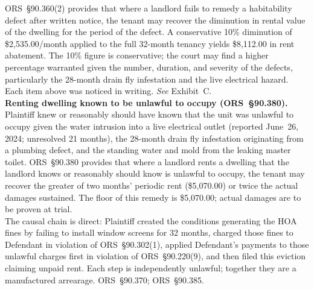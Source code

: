 \documentclass[10pt,letterpaper,oneside]{extarticle}
\begin{document}
\indent ORS~\S90.360(2) provides that where a landlord
fails to remedy a habitability defect after written notice,
the tenant may recover the diminution in rental value of
the dwelling for the period of the defect. A conservative
10\% diminution of \$2,535.00/month applied to the full
32-month tenancy yields \$8,112.00 in rent abatement. The
10\% figure is conservative; the court may find a higher
percentage warranted given the number, duration, and
severity of the defects, particularly the 28-month drain
fly infestation and the live electrical hazard. Each item
above was noticed in writing. \textit{See} Exhibit~C.\\
\indent \textbf{Renting dwelling known to be unlawful to
	occupy (ORS~\S90.380).} Plaintiff knew or reasonably should
have known that the unit was unlawful to occupy given the
water intrusion into a live electrical outlet (reported
June~26, 2024; unresolved 21 months), the 28-month drain
fly infestation originating from a plumbing defect, and the
standing water and mold from the leaking master toilet.
ORS~\S90.380 provides that where a landlord rents a
dwelling that the landlord knows or reasonably should know
is unlawful to occupy, the tenant may recover the greater
of two months' periodic rent (\$5,070.00) or twice the
actual damages sustained. The floor of this remedy is
\$5,070.00; actual damages are to be proven at trial.\\
\indent The causal chain is direct: Plaintiff created the
conditions generating the HOA fines by failing to install
window screens for 32 months, charged those fines to
Defendant in violation of ORS~\S90.302(1), applied
Defendant's payments to those unlawful charges first in
violation of ORS~\S90.220(9), and then filed this eviction
claiming unpaid rent. Each step is independently
unlawful; together they are a manufactured arrearage.
ORS~\S90.370; ORS~\S90.385.
\end{document}
